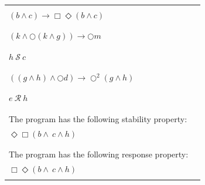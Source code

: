 \documentclass[12pt]{article}
\begin{document}
\begin{enumerate}
\begin{table}
\begin{tabular}{|l|l|}
&\\
		
$(b \wedge c) \rightarrow \Box \Diamond (b \wedge c)$  &\\

&\\

\hline

&\\
		
$(k \wedge \bigcirc (k \wedge g)) \rightarrow \bigcirc m$  &\\

&\\

\hline

&\\
		
$ h ~\mathcal{S}~ c$								 &\\

&\\

\hline

&\\
		
$ ((g \wedge h) \wedge \bigcirc d) \rightarrow \bigcirc^{2} (g \wedge h)$  &\\

&\\

\hline

&\\
		
$e ~\mathcal{R}~ h$									 &\\

&\\

\hline

&\\
		
The program has the following stability property: &\\
$\Diamond \Box (b \wedge \ c \wedge h)$		 &\\

&\\

\hline

&\\
		
The program has the following response property: &\\
$\Box \Diamond (b \wedge \ c \wedge h)$		 &\\

&\\


\end{tabular}
\end{table}
\end{enumerate}
\end{document}
